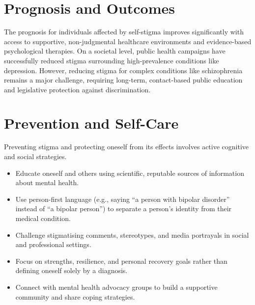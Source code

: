 \section*{Prognosis and Outcomes}
The prognosis for individuals affected by self-stigma improves significantly with access to supportive, non-judgmental healthcare environments and evidence-based psychological therapies. On a societal level, public health campaigns have successfully reduced stigma surrounding high-prevalence conditions like depression. However, reducing stigma for complex conditions like schizophrenia remains a major challenge, requiring long-term, contact-based public education and legislative protection against discrimination.

\section*{Prevention and Self-Care}
Preventing stigma and protecting oneself from its effects involves active cognitive and social strategies.
\begin{itemize}
    \item Educate oneself and others using scientific, reputable sources of information about mental health.
    \item Use person-first language (e.g., saying ``a person with bipolar disorder'' instead of ``a bipolar person'') to separate a person's identity from their medical condition.
    \item Challenge stigmatising comments, stereotypes, and media portrayals in social and professional settings.
    \item Focus on strengths, resilience, and personal recovery goals rather than defining oneself solely by a diagnosis.
    \item Connect with mental health advocacy groups to build a supportive community and share coping strategies.
\end{itemize}

